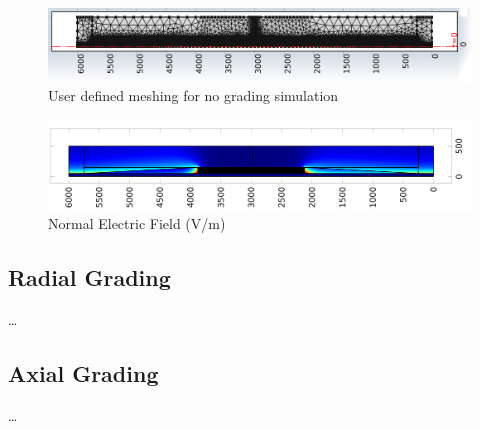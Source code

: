 \begin{figure}[!h]
  \centering
    \includegraphics[width = \textwidth]{./Figures/Simulations/Edited_No_Grading_Final/Meshing.png} 
	\caption{User defined meshing for no grading simulation}
\label{Figure:No_Grading_Mesh}
\end{figure}

\begin{figure}[!h]
  \centering

    \includegraphics[width = \textwidth]{./Figures/Simulations/Edited_No_Grading_Final/E_Field_Norm.png} 
	\caption{Normal Electric Field (V/m)}
\label{Figure:No_Grading_Field}
\end{figure}

\subsection{Radial Grading}
\dots

\subsection{Axial Grading}
\dots

\clearpage 

